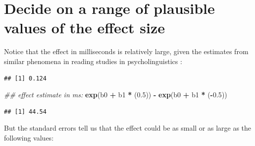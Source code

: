 \documentclass[12pt,]{krantz}
\newenvironment{Shaded}{\begin{snugshade}}{\end{snugshade}}
\newcommand{\CommentTok}[1]{\textcolor[rgb]{0.56,0.35,0.01}{\textit{#1}}}
\newcommand{\DecValTok}[1]{\textcolor[rgb]{0.00,0.00,0.81}{#1}}
\newcommand{\FloatTok}[1]{\textcolor[rgb]{0.00,0.00,0.81}{#1}}
\newcommand{\KeywordTok}[1]{\textcolor[rgb]{0.13,0.29,0.53}{\textbf{#1}}}
\newcommand{\NormalTok}[1]{#1}
\newcommand{\OperatorTok}[1]{\textcolor[rgb]{0.81,0.36,0.00}{\textbf{#1}}}
\newcommand{\StringTok}[1]{\textcolor[rgb]{0.31,0.60,0.02}{#1}}
\begin{document}
\hypertarget{decide-on-a-range-of-plausible-values-of-the-effect-size}{%
\section{Decide on a range of plausible values of the effect size}\label{decide-on-a-range-of-plausible-values-of-the-effect-size}}

Notice that the effect in milliseconds is relatively large, given the estimates from similar phenomena in reading studies in psycholinguistics \citep{JaegerEngelmannVasishth2017}:

\begin{Shaded}
\end{Shaded}

\begin{verbatim}
## [1] 0.124
\end{verbatim}

\begin{Shaded}
\begin{Highlighting}[]
\CommentTok{## effect estimate in ms:}
\KeywordTok{exp}\NormalTok{(b0 }\OperatorTok{+}\StringTok{ }\NormalTok{b1 }\OperatorTok{*}\StringTok{ }\NormalTok{(}\FloatTok{0.5}\NormalTok{)) }\OperatorTok{-}\StringTok{ }\KeywordTok{exp}\NormalTok{(b0 }\OperatorTok{+}\StringTok{ }\NormalTok{b1 }\OperatorTok{*}\StringTok{ }\NormalTok{(}\OperatorTok{-}\FloatTok{0.5}\NormalTok{))}
\end{Highlighting}
\end{Shaded}

\begin{verbatim}
## [1] 44.54
\end{verbatim}

But the standard errors tell us that the effect could be as small or as large as the following values:

\begin{Shaded}
\end{Shaded}
\end{document}
